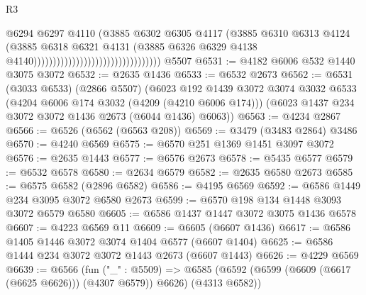 \begin{lexlean}{R3}
\begin{coremodule}
                                                              @6294
                                                              @6297
                                                              @4110
                                                              (@3885
                                                                @6302
                                                                @6305
                                                                @4117
                                                                (@3885
                                                                  @6310
                                                                  @6313
                                                                  @4124
                                                                  (@3885
                                                                    @6318
                                                                    @6321
                                                                    @4131
                                                                    (@3885
                                                                      @6326
                                                                      @6329
                                                                      @4138
                                                                      @4140)))))))))))))))))))))))))))))))))
    @5507
@6531 := @4182 @6006 @532 @1440 @3075 @3072
@6532 := @2635 @1436
@6533 := @6532 @2673
@6562 := @6531
    (@3033 @6533)
    (@2866 @5507)
    (@6023
      @192
      @1439
      @3072
      @3074
      @3032
      @6533
      (@4204 @6006 @174 @3032 (@4209 (@4210 @6006 @174)))
      (@6023 @1437 @234 @3072 @3072 @1436 @2673 (@6044 @1436) @6063))
@6563 := @4234 @2867
@6566 := @6526 (@6562 (@6563 @208))
@6569 := @3479 (@3483 @2864) @3486
@6570 := @4240 @6569
@6575 := @6570 @251 @1369 @1451 @3097 @3072
@6576 := @2635 @1443
@6577 := @6576 @2673
@6578 := @5435 @6577
@6579 := @6532 @6578
@6580 := @2634 @6579
@6582 := @2635 @6580 @2673
@6585 := @6575 @6582 (@2896 @6582)
@6586 := @4195 @6569
@6592 := @6586 @1449 @234 @3095 @3072 @6580 @2673
@6599 := @6570 @198 @134 @1448 @3093 @3072 @6579 @6580
@6605 := @6586 @1437 @1447 @3072 @3075 @1436 @6578
@6607 := @4223 @6569 @11
@6609 := @6605 (@6607 @1436)
@6617 := @6586 @1405 @1446 @3072 @3074 @1404 @6577 (@6607 @1404)
@6625 := @6586 @1444 @234 @3072 @3072 @1443 @2673 (@6607 @1443)
@6626 := @4229 @6569
@6639 := @6566
    (fun ("_" : @5509) =>
    @6585 (@6592 (@6599 (@6609 (@6617 (@6625 @6626))) (@4307 @6579)) @6626) (@4313 @6582))

\end{coremodule}
\end{lexlean}

